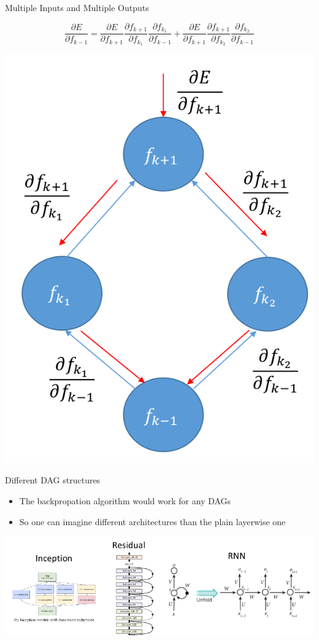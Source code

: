 \documentclass[12pt,notes,mathserif]{beamer}
\newcommand{\pp}[2]{\frac{\partial #1}{\partial #2}}
\providecommand{\tightlist}{%
	\setlength{\itemsep}{0pt}\setlength{\parskip}{0pt}}
\begin{document}
\begin{frame}{Multiple Inputs and Multiple Outputs}

\[\frac{\partial E}{\partial f_{k-1}}=\pp{E}{f_{k+1}}\pp{f_{k+1}}{f_{k_1}}\pp{f_{k_1}}{f_{k-1}}+\pp{E}{f_{k+1}} \pp{f_{k+1}}{f_{k_2}}\pp{f_{k_2}}{f_{k-1}}\]

\begin{center}
    \includegraphics[width=.4\textwidth]{2018-04-15-13-10-08.png}
\end{center}

\end{frame}

\begin{frame}{Different DAG structures}

\begin{itemize}
\tightlist
\item
  The backpropation algorithm would work for any DAGs
\item
  So one can imagine different architectures than the plain layerwise
  one
\end{itemize}

\begin{center}
    \includegraphics[width=.9\textwidth]{2018-04-14-00-19-13.png}
\end{center}

\end{frame}
\end{document}
